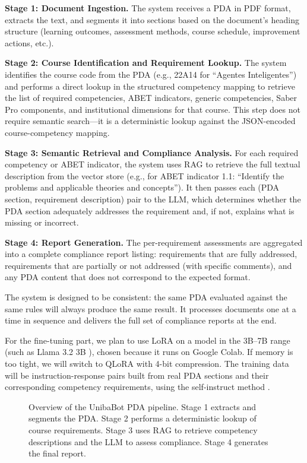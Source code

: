 \documentclass[conference]{IEEEtran}
\begin{document}
\textbf{Stage 1: Document Ingestion.} The system receives a PDA in PDF format, extracts the text, and segments it into sections based on the document's heading structure (learning outcomes, assessment methods, course schedule, improvement actions, etc.).

\textbf{Stage 2: Course Identification and Requirement Lookup.} The system identifies the course code from the PDA (e.g., 22A14 for ``Agentes Inteligentes'') and performs a direct lookup in the structured competency mapping to retrieve the list of required competencies, ABET indicators, generic competencies, Saber Pro components, and institutional dimensions for that course. This step does not require semantic search---it is a deterministic lookup against the JSON-encoded course-competency mapping.

\textbf{Stage 3: Semantic Retrieval and Compliance Analysis.} For each required competency or ABET indicator, the system uses RAG to retrieve the full textual description from the vector store (e.g., for ABET indicator 1.1: ``Identify the problems and applicable theories and concepts''). It then passes each (PDA section, requirement description) pair to the LLM, which determines whether the PDA section adequately addresses the requirement and, if not, explains what is missing or incorrect.

\textbf{Stage 4: Report Generation.} The per-requirement assessments are aggregated into a complete compliance report listing: requirements that are fully addressed, requirements that are partially or not addressed (with specific comments), and any PDA content that does not correspond to the expected format.

The system is designed to be consistent: the same PDA evaluated against the same rules will always produce the same result. It processes documents one at a time in sequence and delivers the full set of compliance reports at the end.

For the fine-tuning part, we plan to use LoRA \cite{hu2022lora} on a model in the 3B--7B range (such as Llama 3.2 3B \cite{touvron2023llama}), chosen because it runs on Google Colab. If memory is too tight, we will switch to QLoRA \cite{dettmers2023qlora} with 4-bit compression. The training data will be instruction-response pairs built from real PDA sections and their corresponding competency requirements, using the self-instruct method \cite{wang2022selfinstruct}.

\begin{figure}[ht]
\centering
{}
\caption{Overview of the UnibaBot PDA pipeline. Stage 1 extracts and segments the PDA. Stage 2 performs a deterministic lookup of course requirements. Stage 3 uses RAG to retrieve competency descriptions and the LLM to assess compliance. Stage 4 generates the final report.}
\label{fig:architecture_placeholder}
\end{figure}
\end{document}
